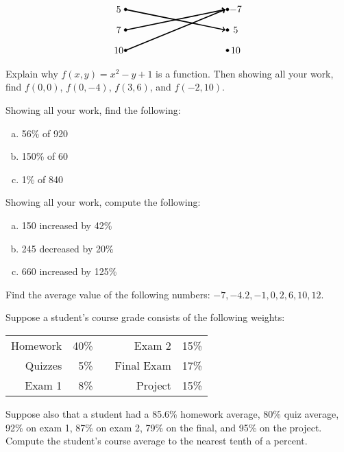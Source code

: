 \documentclass[12pt,letterpaper]{exam}
\begin{document}
\begin{questions}
\[\begin{tikzpicture}[scale=0.75]
	\draw[fill=black] (0,1) circle (0.07);
	\draw[fill=black] (0,0) circle (0.07);
	\draw[fill=black] (0,-1) circle (0.07);
	
	\draw[fill=black] (5,1) circle (0.07);
	\draw[fill=black] (5,0) circle (0.07);
	\draw[fill=black] (5,-1) circle (0.07);
	
	\draw[line width=0.04cm,->] (0,1) -- (4.9,0);
	\draw[line width=0.04cm,->] (0,0) -- (4.9,1);
	\draw[line width=0.04cm,->] (0,-1) -- (4.9,1);
	
	\node at (-0.3,1) {$5\,$};
	\node at (-0.3,0) {$7\,$};
	\node at (-0.3,-1) {$10\,$};
	
	\node at (5.4,1) {$-7$};
	\node at (5.4,0) {$5$};
	\node at (5.4,-1) {$10$};
	\end{tikzpicture}
	\]



\newpage
\question[10] Explain why $f(x, y)= x^2 - y + 1$ is a function. Then showing all your work, find $f(0, 0)$, $f(0, -4)$, $f(3, 6)$, and $f(-2, 10)$. 



\newpage
\question[10] Showing all your work, find the following:
	\begin{enumerate}[(a)]
	\item 56\% of 920
	\item 150\% of 60
	\item 1\% of 840
	\end{enumerate}



\newpage
\question[10] Showing all your work, compute the following:
	\begin{enumerate}[(a)]
	\item 150 increased by 42\%
	\item 245 decreased by 20\%
	\item 660 increased by 125\%
	\end{enumerate}



\newpage
\question[10] Find the average value of the following numbers: $-7, -4.2, -1, 0, 2, 6, 10, 12$.



\newpage
\question[10] Suppose a student's course grade consists of the following weights: \par
	\begin{table}[!ht]
	\centering
	\begin{tabular}{rrcrr}
	Homework & 40\% & & Exam 2 & 15\% \\
	Quizzes & 5\% & & Final Exam & 17\% \\
	Exam 1 & 8\% & & Project & 15\% \\
	\end{tabular}
	\end{table} \par
Suppose also that a student had a 85.6\% homework average, 80\% quiz average, 92\% on exam 1, 87\% on exam 2, 79\% on the final, and 95\% on the project. Compute the student's course average to the nearest tenth of a percent. 




\end{questions}
\end{document}
